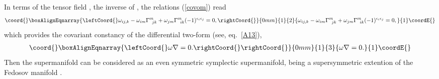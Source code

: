\documentclass[a4paper,11pt]{article}
\begin{document}
In terms of the tensor field \coordHE{}, the inverse of
\coordHE{}, the relations (\ref{covom}) read
\begin{eqnarray}\coord{}\boxAlignEqnarray{\leftCoord{}
\label{covomiv} \omega_{ij,k}-\omega_{im}\Gamma^m_{\;\;jk}+
\omega_{jm}\Gamma^m_{\;\;ik}(-1)^{\epsilon_i\epsilon_j}=0,
\rightCoord{}}{0mm}{1}{2}{
\omega_{ij,k}-\omega_{im}\Gamma^m_{\;\;jk}+
\omega_{jm}\Gamma^m_{\;\;ik}(-1)^{\epsilon_i\epsilon_j}=0,
}{1}\coordE{}\end{eqnarray}
which provides the covariant constancy of the differential
two-form \myHighlight{$\omega $}\coordHE{} (see, eq.~\ref{A13}),
\begin{eqnarray}\coord{}\boxAlignEqnarray{\leftCoord{}
\label{covform}
\omega\nabla=0. \rightCoord{}
\rightCoord{}}{0mm}{1}{3}{
\omega\nabla=0. 
}{1}\coordE{}\end{eqnarray}
Then the supermanifold \coordHE{} can be considered as an even symmetric
symplectic supermanifold, being a supersymmetric extention of the
Fedosov manifold \cite {F,fm}.
\end{document}
